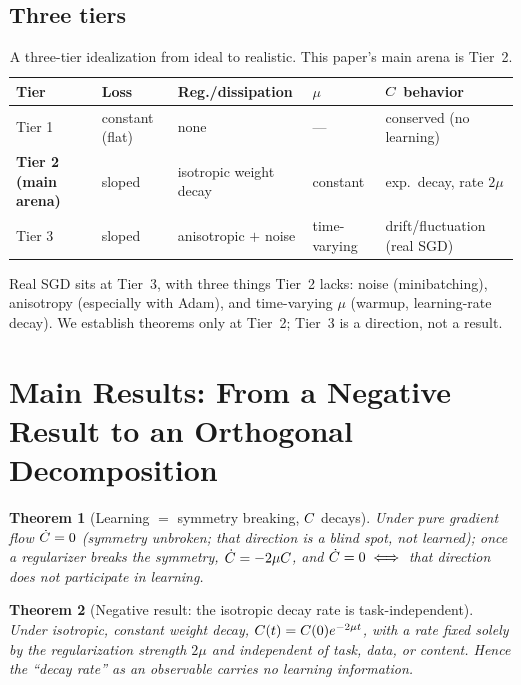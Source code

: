 \documentclass[11pt]{article}
\newtheorem{Theorem}{Theorem}[section]
\begin{document}
\subsection{Three tiers}\label{sec:ladder:three}
\begin{table}[h]
\centering
\caption{A three-tier idealization from ideal to realistic. This paper's main arena is Tier~2.}
\label{tab:three-stages}
\begin{tabular}{lllll}
\toprule
\textbf{Tier} & \textbf{Loss} & \textbf{Reg./dissipation} & \textbf{$\mu$} & \textbf{$C$ behavior} \\
\midrule
Tier 1 & constant (flat) & none & --- & conserved (no learning) \\
\textbf{Tier 2 (main arena)} & sloped & isotropic weight decay & constant & exp.\ decay, rate $2\mu$ \\
Tier 3 & sloped & anisotropic $+$ noise & time-varying & drift/fluctuation (real SGD) \\
\bottomrule
\end{tabular}
\end{table}
Real SGD sits at Tier~3, with three things Tier~2 lacks: noise (minibatching), anisotropy
(especially with Adam), and time-varying $\mu$ (warmup, learning-rate decay). We establish theorems
only at Tier~2; Tier~3 is a direction, not a result.

\section{Main Results: From a Negative Result to an Orthogonal Decomposition}\label{sec:main}

\begin{Theorem}[Learning $=$ symmetry breaking, $C$ decays]\label{thm:break}
Under pure gradient flow $\dot{C}=0$ (symmetry unbroken; that direction is a blind spot, not
learned); once a regularizer breaks the symmetry, $\dot{C}=-2\mu C$, and
$\dot{C}=0 \iff$ that direction does not participate in learning.
\end{Theorem}

\begin{Theorem}[Negative result: the isotropic decay rate is task-independent]\label{thm:negative}
Under isotropic, constant weight decay, $C(t)=C(0)e^{-2\mu t}$, with a rate fixed solely by
the regularization strength $2\mu$ and independent of task, data, or content. Hence the ``decay
rate'' as an observable carries no learning information.
\end{Theorem}
\end{document}
